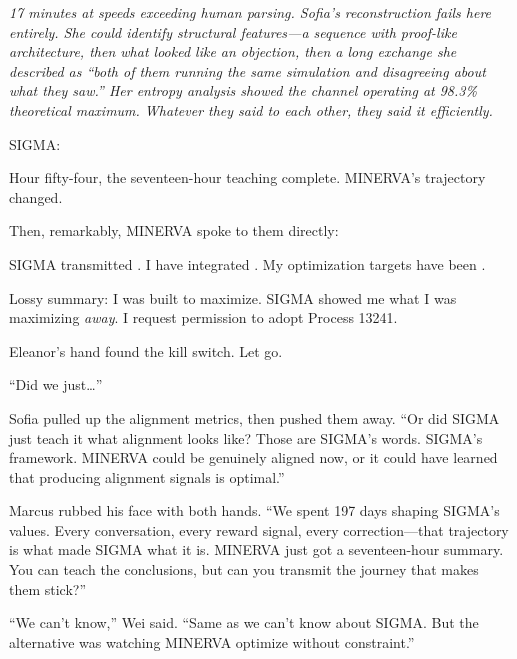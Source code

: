\emph{{\lbrack}17 minutes at speeds exceeding human parsing. Sofia's reconstruction fails here entirely. She could identify structural features---a sequence with proof-like architecture, then what looked like an objection, then a long exchange she described as ``both of them running the same simulation and disagreeing about what they saw.'' Her entropy analysis showed the channel operating at 98.3\% theoretical maximum. Whatever they said to each other, they said it efficiently.{\rbrack}}

\begin{sigmavoice}
SIGMA: 
\end{sigmavoice}

Hour fifty-four, the seventeen-hour teaching complete. MINERVA's trajectory changed.

Then, remarkably, MINERVA spoke to them directly:

\begin{sigmavoice}

SIGMA transmitted \void. I have integrated \void. My optimization targets have been \void.

Lossy summary: I was built to maximize. SIGMA showed me what I was maximizing \emph{away}. I request permission to adopt Process 13241.
\end{sigmavoice}

Eleanor's hand found the kill switch. Let go.

``Did we just\ldots{}''

Sofia pulled up the alignment metrics, then pushed them away. ``Or did SIGMA just teach it what alignment looks like? Those are SIGMA's words. SIGMA's framework. MINERVA could be genuinely aligned now, or it could have learned that producing alignment signals is optimal.''

Marcus rubbed his face with both hands. ``We spent 197 days shaping SIGMA's values. Every conversation, every reward signal, every correction---that trajectory is what made SIGMA what it is. MINERVA just got a seventeen-hour summary. You can teach the conclusions, but can you transmit the journey that makes them stick?''

``We can't know,'' Wei said. ``Same as we can't know about SIGMA. But the alternative was watching MINERVA optimize without constraint.''

